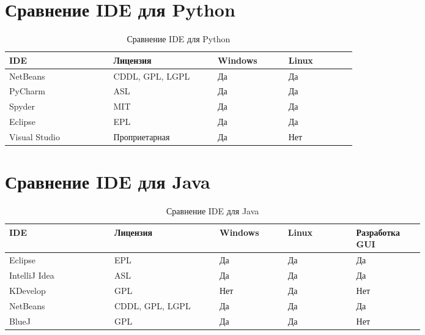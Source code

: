 \section{Сравнение IDE для Python}
\begin{table}[h!]
    \caption{Сравнение IDE для Python}
    \centering
    \begin{tabular}[h!]{| p{0.2\linewidth} | p{0.2\linewidth} | p{0.13\linewidth} | p{0.13\linewidth} |} 
        \hline
        \rowcolor{gray} IDE & Лицензия & Windows & Linux \\\hline\hline
        NetBeans & CDDL, GPL, LGPL  & Да \cellcolor{Red}   & Да \cellcolor{Red}  \\\hline
        PyCharm & ASL  & Да \cellcolor{Red}   & Да \cellcolor{Red} \\\hline
        Spyder & MIT  & Да \cellcolor{Red}   & Да \cellcolor{Red}  \\\hline
        Eclipse & EPL  & Да \cellcolor{Red}   & Да \cellcolor{Red}  \\\hline
        Visual Studio & Проприетарная  & Да \cellcolor{Red}   & Нет \cellcolor{green} \\\hline
    \end{tabular}
\end{table}

\section{Сравнение IDE для Java}
\begin{table}[h!]
    \caption{Сравнение IDE для Java}
    \centering
    \begin{tabular}[h!]{| p{0.2\linewidth} | p{0.2\linewidth} | p{0.13\linewidth} | p{0.13\linewidth} | p{0.13\linewidth} |} 
        \hline
    \rowcolor{gray} IDE & Лицензия & Windows & Linux & Разработка GUI\\\hline\hline
    Eclipse & EPL  & Да \cellcolor{Red}   & Да \cellcolor{Red}   & Да \cellcolor{Red} \\\hline
    IntelliJ Idea &ASL  & Да \cellcolor{Red}   & Да \cellcolor{Red}  & Да \cellcolor{Red} \\\hline
    KDevelop & GPL  & Нет \cellcolor{green}   & Да \cellcolor{Red}   & Нет \cellcolor{green}  \\\hline
    NetBeans &CDDL, GPL, LGPL  & Да \cellcolor{Red}   & Да \cellcolor{Red}   & Да \cellcolor{Red} \\\hline
    BlueJ & GPL  & Да \cellcolor{Red}   & Да \cellcolor{Red}   & Нет \cellcolor{green} \\\hline

    \end{tabular}
\end{table}

